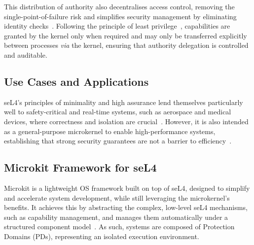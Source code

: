 This distribution of authority also decentralises access control, removing the single-point-of-failure risk and simplifies security management by eliminating identity checks~\cite{rotondi_managing_2012}. Following the principle of least privilege~\cite{schneider_least_2004}, capabilities are granted by the kernel only when required and may only be transferred explicitly between processes \textit{via} the kernel, ensuring that authority delegation is controlled and auditable.

\subsection{Use Cases and Applications}

seL4’s principles of minimality and high assurance lend themselves particularly well to safety-critical and real-time systems, such as aerospace and medical devices, where correctness and isolation are crucial~\cite{heiser_l4_2016}. However, it is also intended as a general-purpose microkernel to enable high-performance systems, establishing that strong security guarantees are not a barrier to efficiency~\cite{klein_sel4_2009}.

\subsection{Microkit Framework for seL4}\label{sec:microkitbg}

Microkit is a lightweight OS framework built on top of seL4, designed to simplify and accelerate system development, while still leveraging the microkernel's benefits. It achieves this by abstracting the complex, low-level seL4 mechanisms, such as capability management, and manages them automatically under a structured component model~\cite{kocsis_sel4_2023}. As such, systems are composed of Protection Domains (PDs), representing an isolated execution environment.

